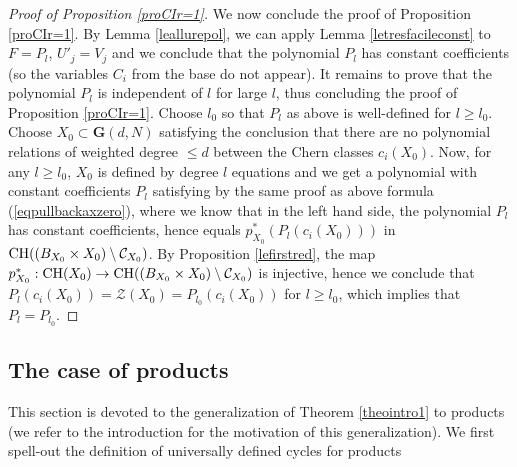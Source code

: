\documentclass[10pt]{article}
\begin{document}
\begin{proof}[Proof of Proposition \ref{proCIr=1}]
We now conclude the proof of Proposition \ref{proCIr=1}. By Lemma \ref{leallurepol}, we can   apply Lemma \ref{letresfacileconst}  to $F=P_l$, $U'_j=V_j$ and we
conclude   that the polynomial $P_l$ has constant coefficients (so the variables $C_i$ from the base do not appear).
It remains to prove that the polynomial $P_l$ is independent of $l$ for large $l$, thus concluding the
proof of Proposition \ref{proCIr=1}.
Choose $l_0$ so that $P_l$ as above is well-defined for $l\geq l_0$. Choose
 $X_0\subset \mathbf{G}(d,N)$ satisfying the conclusion that
 there are no polynomial relations of weighted degree
  $\leq d$ between the Chern classes $c_i(X_0)$. Now, for any $l\geq l_0$,  $X_0$ is defined by degree
$l$ equations and we get
a polynomial with constant coefficients $P_l$   satisfying  by the same proof  as above
 formula (\ref{eqpullbackaxzero}), where
we know
that in  the left hand side, the polynomial $P_l$  has constant coefficients, hence equals
$p_{X_0}^*(P_l(c_i(X_0)))$ in ${\rm CH}(( B_{X_0}\times X_0)\setminus \mathcal{C}_{X_0})$.
By Proposition \ref{lefirstred}, the map $p_{X_0}^*:{\rm CH}(X_0)\rightarrow {\rm CH}((B_{X_0}\times X_0)\setminus \mathcal{C}_{X_0})$ is injective, hence we conclude
that $P_l(c_i(X_0))=\mathcal{Z}(X_0)=P_{l_0}(c_i(X_0))$ for $l\geq l_0$, which implies that
$P_l=P_{l_0}$.
\end{proof}
\subsection{The case of products}
This section is devoted to the generalization of Theorem \ref{theointro1} to products (we refer to the introduction for the motivation of this generalization). We first spell-out the  definition of universally defined cycles for products
\end{document}
